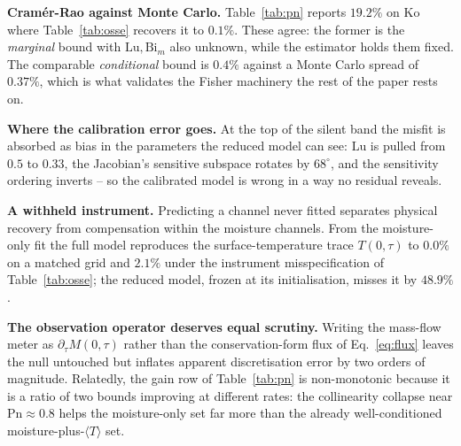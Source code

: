 \documentclass{article}
\begin{document}
\textbf{Cram\'er-Rao against Monte Carlo.} Table~\ref{tab:pn} reports $19.2\%$ on $\mathrm{Ko}$ where
Table~\ref{tab:osse} recovers it to $0.1\%$. These agree: the former is the \emph{marginal} bound with
$\mathrm{Lu},\mathrm{Bi}_m$ also unknown, while the estimator holds them fixed. The comparable
\emph{conditional} bound is $0.4\%$ against a Monte Carlo spread of $0.37\%$, which is what validates
the Fisher machinery the rest of the paper rests on.

\textbf{Where the calibration error goes.} At the top of the silent band the misfit is absorbed as
bias in the parameters the reduced model can see: $\mathrm{Lu}$ is pulled from $0.5$ to $0.33$, the
Jacobian's sensitive subspace rotates by $68^\circ$, and the sensitivity ordering inverts -- so the
calibrated model is wrong in a way no residual reveals.

\textbf{A withheld instrument.} Predicting a channel never fitted separates physical recovery from
compensation within the moisture channels. From the moisture-only fit the full model reproduces the
surface-temperature trace $T(0,\tau)$ to $0.0\%$ on a matched grid and $2.1\%$ under the instrument
misspecification of Table~\ref{tab:osse}; the reduced model, frozen at its initialisation, misses it
by $48.9\%$.

\textbf{The observation operator deserves equal scrutiny.} Writing the mass-flow meter as
$\partial_\tau M(0,\tau)$ rather than the conservation-form flux of Eq.~\ref{eq:flux} leaves the null
untouched but inflates apparent discretisation error by two orders of magnitude. Relatedly, the gain
row of Table~\ref{tab:pn} is non-monotonic because it is a ratio of two bounds improving at different
rates: the collinearity collapse near $\mathrm{Pn}\!\approx\!0.8$ helps the moisture-only set far more
than the already well-conditioned moisture-plus-$\langle T\rangle$ set.
\end{document}
